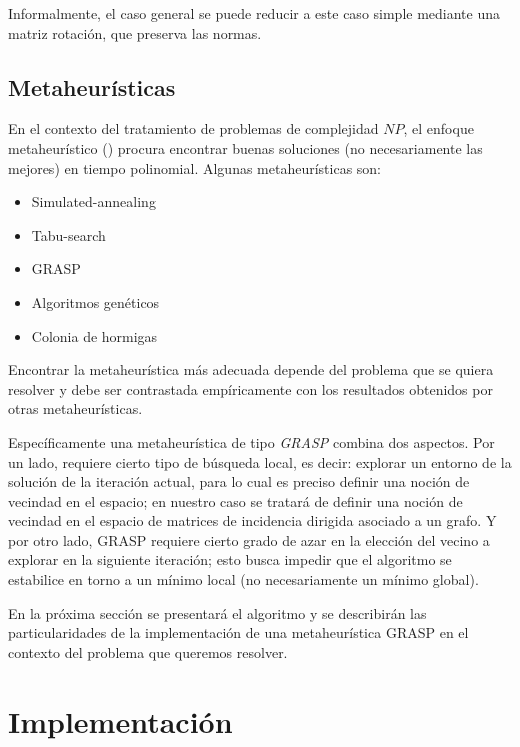 \documentclass[conference,compsoc,a4paper]{IEEEtran}
\begin{document}
\smallskip

Informalmente, el caso general se puede reducir a este caso simple 
mediante una matriz rotación, que preserva las normas.

\subsection{Metaheurísticas}

En el contexto del tratamiento de problemas de complejidad $NP$, el 
enfoque metaheurístico (\cite{GP:2010,Talbi:2009}) procura encontrar buenas soluciones (no 
necesariamente las mejores) en tiempo polinomial. Algunas 
metaheurísticas son:

\begin{itemize}
	\item Simulated-annealing
	\item Tabu-search
	\item GRASP
	\item Algoritmos genéticos
	\item Colonia de hormigas
\end{itemize}

Encontrar la metaheurística más adecuada depende del problema que se 
quiera resolver y debe ser contrastada empíricamente con los resultados 
obtenidos por otras metaheurísticas.

\smallskip

Específicamente una metaheurística de tipo \textit{GRASP} combina dos 
aspectos. Por un lado, requiere cierto tipo de búsqueda local, es decir: 
explorar un entorno de la solución de la iteración actual, para lo cual 
es preciso definir una noción de vecindad en el espacio; en nuestro caso 
se tratará de definir una noción de vecindad en el espacio de matrices 
de incidencia dirigida asociado a un grafo. Y por otro lado, GRASP 
requiere cierto grado de azar en la elección del vecino a explorar en 
la siguiente iteración; esto busca impedir que el algoritmo se 
estabilice en torno a un mínimo local (no necesariamente un mínimo 
global). 

\smallskip

En la próxima sección se presentará el algoritmo y se describirán las 
particularidades de la implementación de una metaheurística GRASP en el 
contexto del problema que queremos resolver.

\section{Implementación}
\end{document}
